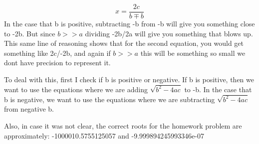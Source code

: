 \documentclass[11pt]{article}
\begin{document}
\begin{equation}
 x = \frac{2c}{b \mp b}
\end{equation}
In the case that b is positive, subtracting -b from -b will give you something close to -2b. But since $b>>a$ dividing -2b/2a will give you something that blows up. This same line of reasoning shows that for the second equation, you would get something like 2c/-2b, and again if $b>>a$ this will be something so small we dont have precision to represent it.
\par
To deal with this, first I check if b is positive or negative. If b is positive, then we want to use the equations where we are adding $ \sqrt{b^2 - 4ac}$ to -b. In the case that b is negative, we want to use the equations where we are subtracting $ \sqrt{b^2 - 4ac}$ from negative b. 

\par 

Also, in case it was not clear, the correct roots for the homework problem are approximately: -1000010.5755125057 and
-9.999894245993346e-07
\end{document}
